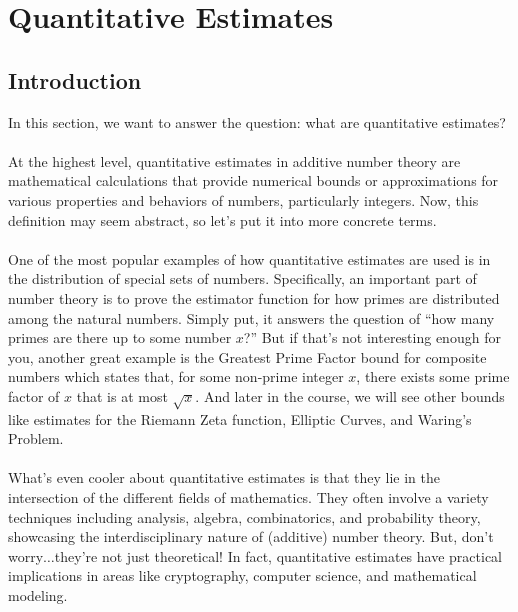 \documentclass[8pt]{extarticle}
\begin{document}
\pagebreak
\section{Quantitative Estimates}
\subsection{Introduction}
In this section, we want to answer the question: what are quantitative estimates? \\
\\
At the highest level, quantitative estimates in additive number theory are mathematical calculations that provide numerical bounds or approximations for various properties and behaviors of numbers, particularly integers. Now, this definition may seem abstract, so let's put it into more concrete terms.\\
\\
One of the most popular examples of how quantitative estimates are used is in the distribution of special sets of numbers. Specifically, an important part of number theory is to prove the estimator function for how primes are distributed among the natural numbers. Simply put, it answers the question of ``how many primes are there up to some number $x$?'' But if that's not interesting enough for you, another great example is the Greatest Prime Factor bound for composite numbers which states that, for some non-prime integer $x$, there exists some prime factor of $x$ that is at most $\sqrt{x}$. And later in the course, we will see other bounds like estimates for the Riemann Zeta function, Elliptic Curves, and Waring's Problem. \\
\\
What's even cooler about quantitative estimates is that they lie in the intersection of the different fields of mathematics. They often involve a variety techniques including analysis, algebra, combinatorics, and probability theory, showcasing the interdisciplinary nature of (additive) number theory. But, don't worry$\dots$they're not just theoretical! In fact, quantitative estimates have practical implications in areas like cryptography, computer science, and mathematical modeling.
\end{document}
